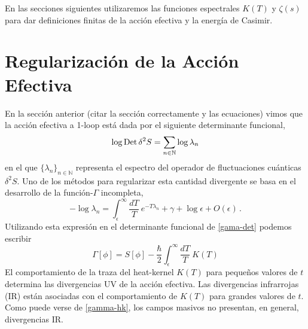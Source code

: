 En las secciones siguientes utilizaremos las funciones espectrales $K(T)$ y $\zeta(s) $ para dar definiciones finitas de la acción efectiva y la energía de Casimir.

\section{Regularización de la Acción Efectiva}

En la sección anterior {\red (citar la sección correctamente y las ecuaciones)} vimos que la acción efectiva a 1-loop está dada por el siguiente determinante funcional,
\begin{equation}
\log {\rm Det} \, \delta ^2 S = 
\sum_{n\in{\mathbb N}} \log \lambda _n
\end{equation}
en el que $\{\lambda_n\}_{n\in\mathbb N}$ representa el espectro del operador de fluctuaciones cuánticas $\delta^2S$. Uno de los métodos para regularizar esta cantidad divergente se basa en el desarrollo de la función-$\Gamma$ incompleta,
\begin{equation}
- \log\lambda_n=\int _ { \epsilon } ^{\infty}\frac{dT}{T}\ e ^{- T \lambda _n} +\gamma+\log\epsilon + O ( \epsilon  ) \,.
\end{equation}
Utilizando esta expresión en el determinante funcional de \eqref{gama-det} podemos escribir
\begin{equation}\label{gamma-hk}
\Gamma [ \phi ] = 
S[ \phi ] - 
\frac{\hbar }{2}
\int _ { \epsilon } ^{\infty} \frac{ dT}{T}\ K(T)
\end{equation}
{\red El comportamiento de la traza del heat-kernel $K(T)$ para pequeños valores de $t$ determina las divergencias UV de la acción efectiva. Las divergencias infrarrojas (IR) están asociadas con el comportamiento de $K(T)$ para grandes valores de $t$. Como puede verse de \eqref{gamma-hk}, los campos masivos no presentan, en general, divergencias IR.}

